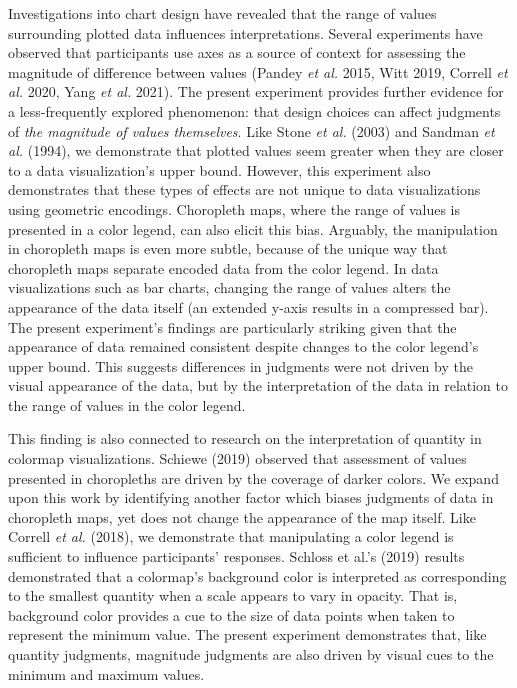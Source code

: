 \documentclass[
]{interact}
\begin{document}
Investigations into chart design have revealed that the range of values
surrounding plotted data influences interpretations. Several experiments
have observed that participants use axes as a source of context for
assessing the magnitude of difference between values (Pandey \emph{et
al.} 2015, Witt 2019, Correll \emph{et al.} 2020, Yang \emph{et al.}
2021). The present experiment provides further evidence for a
less-frequently explored phenomenon: that design choices can affect
judgments of \emph{the magnitude of values themselves}. Like Stone
\emph{et al.} (2003) and Sandman \emph{et al.} (1994), we demonstrate
that plotted values seem greater when they are closer to a data
visualization's upper bound. However, this experiment also demonstrates
that these types of effects are not unique to data visualizations using
geometric encodings. Choropleth maps, where the range of values is
presented in a color legend, can also elicit this bias. Arguably, the
manipulation in choropleth maps is even more subtle, because of the
unique way that choropleth maps separate encoded data from the color
legend. In data visualizations such as bar charts, changing the range of
values alters the appearance of the data itself (an extended y-axis
results in a compressed bar). The present experiment's findings are
particularly striking given that the appearance of data remained
consistent despite changes to the color legend's upper bound. This
suggests differences in judgments were not driven by the visual
appearance of the data, but by the interpretation of the data in
relation to the range of values in the color legend.

This finding is also connected to research on the interpretation of
quantity in colormap visualizations. Schiewe (2019) observed that
assessment of values presented in choropleths are driven by the coverage
of darker colors. We expand upon this work by identifying another factor
which biases judgments of data in choropleth maps, yet does not change
the appearance of the map itself. Like Correll \emph{et al.} (2018), we
demonstrate that manipulating a color legend is sufficient to influence
participants' responses. Schloss et al.'s (2019) results demonstrated
that a colormap's background color is interpreted as corresponding to
the smallest quantity when a scale appears to vary in opacity. That is,
background color provides a cue to the size of data points when taken to
represent the minimum value. The present experiment demonstrates that,
like quantity judgments, magnitude judgments are also driven by visual
cues to the minimum and maximum values.
\end{document}
